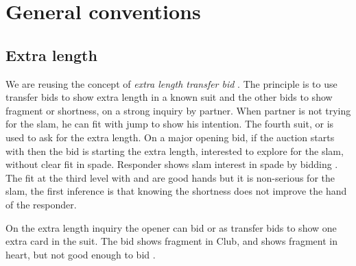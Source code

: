 \chapter{General conventions}
\section{Extra length}
We are reusing the concept of \emph{extra length transfer bid}\cite{extraLength}
. 
The principle is to use transfer bids to show extra length in a known suit and the other bids to show fragment or shortness, on a strong inquiry by partner. When partner is not trying for the slam, he can fit with jump to show his intention. The fourth suit, or  is used to ask for the extra length.
On a major opening bid, if the auction starts with
then the \bid{2\HS} bid is starting the extra length, interested to explore for the slam, without clear fit in spade. Responder shows slam interest in spade by bidding \bid{2\SpS}. The fit at the third level with \bid{3\SpS} and \bid{3\DS} are good hands but it is non-serious for the slam, the first inference is that knowing the shortness does not improve the hand of the responder.

On the extra length inquiry 
the opener can bid \bid{3\CS} or \bid{3\HS} as transfer bids to show one extra card in the suit. The bid \bid{3\HS} shows fragment in Club, and \bid{3\SpS} shows fragment in heart, but not good enough to bid .


